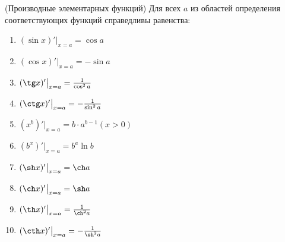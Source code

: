 \begin{theorem} (Производные элементарных функций)
	Для всех $a$ из областей определения соответствующих функций справедливы равенства:
	\begin{enumerate}
		\item $(\sin x)' \big|_{x = a} = \cos a$
		\item $(\cos x)' \big|_{x = a} = -\sin a$
		\item $(\tg x)' \big|_{x = a} = \frac{1}{\cos^2 a}$
		\item $(\ctg x)' \big|_{x = a} = -\frac{1}{\sin^2 a}$
		\item $(x^b)' \big|_{x = a} = b \cdot a^{b - 1} (x > 0)$
		\item $(b^x)' \big|_{x = a} = b^a \ln b$
		\item $(\sh x)' \big|_{x = a} = \ch a$
		\item $(\ch x)' \big|_{x = a} = \sh a$
		\item $(\th x)' \big|_{x = a} = \frac{1}{\ch^2 a}$
		\item $(\cth x)' \big|_{x = a} = -\frac{1}{\sh^2 a}$
	\end{enumerate}
\end{theorem}

